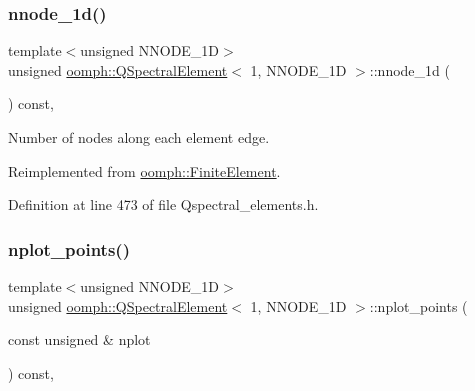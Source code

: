 \subsubsection{\texorpdfstring{nnode\+\_\+1d()}{nnode\_1d()}}
{\footnotesize\ttfamily template$<$unsigned N\+N\+O\+D\+E\+\_\+1D$>$ \\
unsigned \hyperlink{classoomph_1_1QSpectralElement}{oomph\+::\+Q\+Spectral\+Element}$<$ 1, N\+N\+O\+D\+E\+\_\+1D $>$\+::nnode\+\_\+1d (\begin{DoxyParamCaption}{ }\end{DoxyParamCaption}) const\hspace{0.3cm}{\ttfamily [inline]}, {\ttfamily [virtual]}}



Number of nodes along each element edge. 



Reimplemented from \hyperlink{classoomph_1_1FiniteElement_ab65c7a94dda80c1876a09ac12be4e39c}{oomph\+::\+Finite\+Element}.



Definition at line 473 of file Qspectral\+\_\+elements.\+h.

\mbox{\label{classoomph_1_1QSpectralElement_3_011_00_01NNODE__1D_01_4_a5f590bfd5cc59a282f970a8853ad0008}} 
\subsubsection{\texorpdfstring{nplot\+\_\+points()}{nplot\_points()}}
{\footnotesize\ttfamily template$<$unsigned N\+N\+O\+D\+E\+\_\+1D$>$ \\
unsigned \hyperlink{classoomph_1_1QSpectralElement}{oomph\+::\+Q\+Spectral\+Element}$<$ 1, N\+N\+O\+D\+E\+\_\+1D $>$\+::nplot\+\_\+points (\begin{DoxyParamCaption}\item[{const unsigned \&}]{nplot }\end{DoxyParamCaption}) const\hspace{0.3cm}{\ttfamily [inline]}, {\ttfamily [virtual]}}



